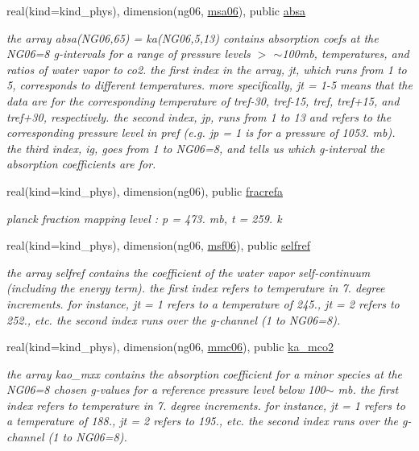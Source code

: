 \begin{DoxyCompactItemize}
real(kind=kind\+\_\+phys), dimension(ng06, \hyperlink{namespacemodule__radlw__kgb06_add7b5d0d3ea44e1e677948c33e870333}{msa06}), public \hyperlink{group__module__radlw__kgbnn_ga21bd40309855c89a64b88be171bfde59}{absa}
\begin{DoxyCompactList}\small\item\em the array absa(\+N\+G06,65) = ka(\+N\+G06,5,13) contains absorption coefs at the N\+G06=8 g-\/intervals for a range of pressure levels $>$ $\sim$100mb, temperatures, and ratios of water vapor to co2. the first index in the array, jt, which runs from 1 to 5, corresponds to different temperatures. more specifically, jt = 1-\/5 means that the data are for the corresponding temperature of tref-\/30, tref-\/15, tref, tref+15, and tref+30, respectively. the second index, jp, runs from 1 to 13 and refers to the corresponding pressure level in pref (e.\+g. jp = 1 is for a pressure of 1053. mb). the third index, ig, goes from 1 to N\+G06=8, and tells us which g-\/interval the absorption coefficients are for. \end{DoxyCompactList}\item 
real(kind=kind\+\_\+phys), dimension(ng06), public \hyperlink{group__module__radlw__kgbnn_ga1354ecbc5f07cd763847333e680c686a}{fracrefa}
\begin{DoxyCompactList}\small\item\em planck fraction mapping level \+: p = 473. mb, t = 259. k \end{DoxyCompactList}\item 
real(kind=kind\+\_\+phys), dimension(ng06, \hyperlink{group__module__radlw__kgbnn_ga65f808aeb87457d383dd7f9366878fb9}{msf06}), public \hyperlink{group__module__radlw__kgbnn_ga98901725947a4477924a47af5e67277e}{selfref}
\begin{DoxyCompactList}\small\item\em the array selfref contains the coefficient of the water vapor self-\/continuum (including the energy term). the first index refers to temperature in 7. degree increments. for instance, jt = 1 refers to a temperature of 245., jt = 2 refers to 252., etc. the second index runs over the g-\/channel (1 to N\+G06=8). \end{DoxyCompactList}\item 
real(kind=kind\+\_\+phys), dimension(ng06, \hyperlink{group__module__radlw__kgbnn_gaf7a377cb66fd48348789c20f5a31dec6}{mmc06}), public \hyperlink{group__module__radlw__kgbnn_gadb5dab732383b82e89f1048ab5150c23}{ka\+\_\+mco2}
\begin{DoxyCompactList}\small\item\em the array kao\+\_\+mxx contains the absorption coefficient for a minor species at the N\+G06=8 chosen g-\/values for a reference pressure level below 100$\sim$ mb. the first index refers to temperature in 7. degree increments. for instance, jt = 1 refers to a temperature of 188., jt = 2 refers to 195., etc. the second index runs over the g-\/channel (1 to N\+G06=8). \end{DoxyCompactList}\end{DoxyCompactItemize}
